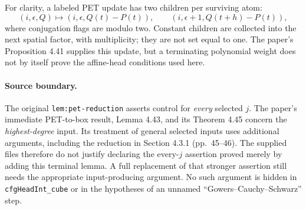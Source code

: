 \documentclass[11pt]{article}
\newcommand{\idname}[1]{\nolinkurl{#1}}
\theoremstyle{definition}\newtheorem{definition}[lemma]{Definition}
\begin{document}
For clarity, a labeled PET update has two children per surviving atom:
\[
 (i,\epsilon,Q)\longmapsto
 (i,\epsilon,Q(t)-P(t)),\qquad
 (i,\epsilon+1,Q(t+h)-P(t)),
\]
where conjugation flags are modulo two. Constant children are collected into the next spatial factor, with multiplicity; they are not set equal to one. The paper's Proposition 4.41 supplies this update, but a terminating polynomial weight does not by itself prove the affine-head conditions used here.

\paragraph{Source boundary.}
The original \idname{lem:pet-reduction} asserts control for \emph{every} selected $j$. The paper's immediate PET-to-box result, Lemma 4.43, and its Theorem 4.45 concern the \emph{highest-degree} input. Its treatment of general selected inputs uses additional arguments, including the reduction in Section 4.3.1 (pp.~45--46). The supplied files therefore do not justify declaring the every-$j$ assertion proved merely by adding this terminal lemma. A full replacement of that stronger assertion still needs the appropriate input-producing argument. No such argument is hidden in \idname{cfgHeadInt_cube} or in the hypotheses of an unnamed ``Gowers--Cauchy--Schwarz'' step.
\end{document}
